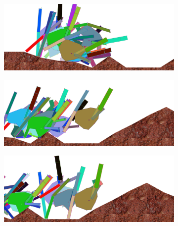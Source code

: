             \begin{figure}[H]
              \centering
              \begin{subfigure}[b]{0.45\textwidth}
                \includegraphics[width=\linewidth,center]{graphics/simulation-results/4_gen7000_1}
                \caption{\label{fig:gen7000_1}}
              \end{subfigure}
              \begin{subfigure}[b]{0.45\textwidth}
                \includegraphics[width=\linewidth,center]{graphics/simulation-results/4_gen7000_2}
                \caption{\label{fig:gen7000_2}}
              \end{subfigure}
              \begin{subfigure}[b]{0.45\textwidth}
                \includegraphics[width=\linewidth,center]{graphics/simulation-results/4_gen7000_3}
                \caption{\label{fig:gen7000_3}}
              \end{subfigure}
              \begin{subfigure}[b]{0.45\textwidth}

\end{subfigure}
\end{figure}
